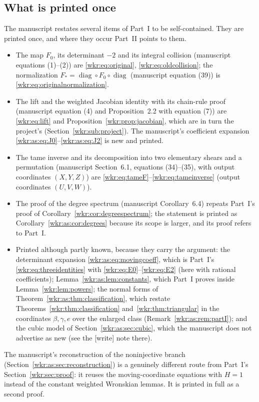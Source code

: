 \documentclass[11pt,a4paper]{article}
\numberwithin{equation}{section}
\theoremstyle{definition}
\theoremstyle{remark}
\newcommand{\diag}{\operatorname{diag}}
\begin{document}
\subsection{What is printed once}\label{wkr:as:sec:duplicates}
The manuscript restates several items of Part~I to be self-contained. They
are printed once, and where they occur Part~II points to them.
\begin{itemize}
\item The map $F_0$, its determinant $-2$ and its integral collision
(manuscript equations (1)--(2)) are \eqref{wkr:eq:original},
\eqref{wkr:eq:oldcollision}; the normalization $F_*=\diag\circ F_0\circ
\diag$ (manuscript equation (39)) is \eqref{wkr:eq:originalnormalization}.
\item The lift and the weighted Jacobian identity with its chain-rule
proof (manuscript equation (4) and Proposition~2.2 with equation (7)) are
\eqref{wkr:eq:lift} and Proposition~\ref{wkr:prop:jacobian}, which are in
turn the project's (Section~\ref{wkr:sub:project}). The manuscript's
coefficient expansion \eqref{wkr:as:eq:J0}--\eqref{wkr:as:eq:J2} is new
and printed.
\item The tame inverse and its decomposition into two elementary shears
and a permutation (manuscript Section~6.1, equations (34)--(35), with output
coordinates $(X,Y,Z)$) are \eqref{wkr:eq:tameF}--\eqref{wkr:eq:tameinverse}
(output coordinates $(U,V,W)$).
\item The proof of the degree spectrum (manuscript Corollary~6.4) repeats
Part~I's proof of Corollary~\ref{wkr:cor:degreespectrum}; the statement is
printed as Corollary~\ref{wkr:as:cor:degrees} because its scope is larger,
and its proof refers to Part~I.
\item Printed although partly known, because they carry the argument:
the determinant expansion \eqref{wkr:as:eq:movingcoeff}, which is Part~I's
\eqref{wkr:eq:threeidentities} with \eqref{wkr:eq:E0}--\eqref{wkr:eq:E2}
(here with rational coefficients); Lemma~\ref{wkr:as:lem:constants},
which Part~I proves inside Lemma~\ref{wkr:lem:powers}; the normal forms
of Theorem~\ref{wkr:as:thm:classification}, which restate
Theorems~\ref{wkr:thm:classification} and~\ref{wkr:thm:triangular} in the
coordinates $\beta,\gamma,e$ over the enlarged class
(Remark~\ref{wkr:as:rem:partI}); and the cubic model of
Section~\ref{wkr:as:sec:cubic}, which the manuscript does not advertise
as new (see the \textup{[write]} note there).
\end{itemize}
The manuscript's reconstruction of the noninjective branch
(Section~\ref{wkr:as:sec:reconstruction}) is a genuinely different route
from Part~I's Section~\ref{wkr:sec:proof}: it reuses the moving-coordinate
equations with $H=1$ instead of the constant weighted Wronskian lemmas.
It is printed in full as a second proof.
\end{document}
